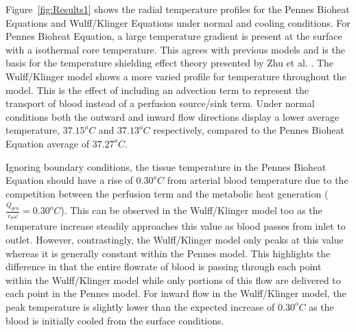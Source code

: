 \documentclass[11pt,english,a4paper,twoside,openright]{report}
\begin{document}
{{{{{{{{Figure~\ref{fig:Results1} shows the radial temperature profiles for the Pennes Bioheat Equations and Wulff/Klinger Equations under normal and cooling conditions. For Pennes Bioheat Equation, a large temperature gradient is present at the surface with a isothermal core temperature. This agrees with previous models and is the basis for the temperature shielding effect theory presented by Zhu et al. \cite{zhu2006body}. The Wulff/Klinger model shows a more varied profile for temperature throughout the model. This is the effect of including an advection term to represent the transport of blood instead of a perfusion source/sink term. Under normal conditions both the outward and inward flow directions display a lower average temperature, $37.15^{o}C$ and $37.13^{o}C$ respectively, compared to the Pennes Bioheat Equation average of $37.27^{o}C$. 

Ignoring boundary conditions, the tissue temperature in the Pennes Bioheat Equation should have a rise of $0.30^{o}C$ from arterial blood temperature due to the competition between the perfusion term and the metabolic heat generation ($\frac{\overline{Q}_{gen}}{c_{b}\overline{\omega}}=0.30^{o}C$). This can be observed in the Wulff/Klinger model too as the temperature increase steadily approaches this value as blood passes from inlet to outlet. However, contrastingly, the Wulff/Klinger model only peaks at this value whereas it is generally constant within the Pennes model. This highlights the difference in that the entire flowrate of blood is passing through each point within the Wulff/Klinger model while only portions of this flow are delivered to each point in the Pennes model. For inward flow in the Wulff/Klinger model, the peak temperature is slightly lower than the expected increase of $0.30^{o}C$ as the blood is initially cooled from the surface conditions. 

}}}}}}}}
\end{document}
